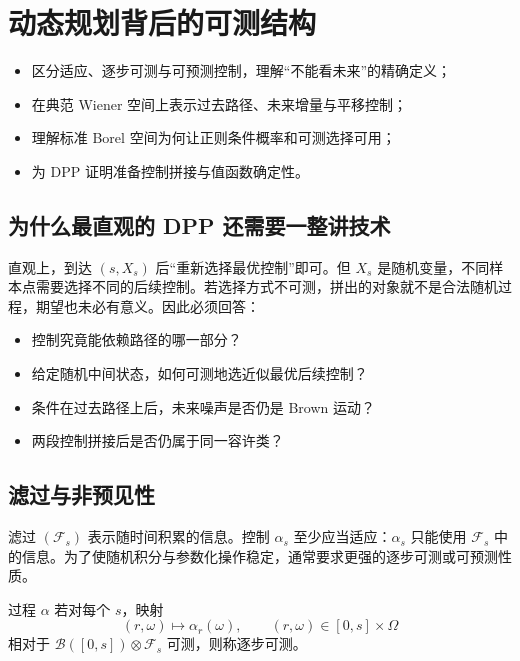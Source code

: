 \chapter{动态规划背后的可测结构}
\begin{learninggoals}
\begin{itemize}
  \item 区分适应、逐步可测与可预测控制，理解“不能看未来”的精确定义；
  \item 在典范 Wiener 空间上表示过去路径、未来增量与平移控制；
  \item 理解标准 Borel 空间为何让正则条件概率和可测选择可用；
  \item 为 DPP 证明准备控制拼接与值函数确定性。
\end{itemize}
\end{learninggoals}

\section{为什么最直观的 DPP 还需要一整讲技术}

直观上，到达 $(s,X_s)$ 后“重新选择最优控制”即可。但 $X_s$ 是随机变量，不同样本点需要选择不同的后续控制。若选择方式不可测，拼出的对象就不是合法随机过程，期望也未必有意义。因此必须回答：

\begin{itemize}
  \item 控制究竟能依赖路径的哪一部分？
  \item 给定随机中间状态，如何可测地选近似最优后续控制？
  \item 条件在过去路径上后，未来噪声是否仍是 Brown 运动？
  \item 两段控制拼接后是否仍属于同一容许类？
\end{itemize}

\section{滤过与非预见性}

滤过 $(\mathcal F_s)$ 表示随时间积累的信息。控制 $\alpha_s$ 至少应当适应：$\alpha_s$ 只能使用 $\mathcal F_s$ 中的信息。为了使随机积分与参数化操作稳定，通常要求更强的逐步可测或可预测性质。

\begin{definition}[逐步可测]
过程 $\alpha$ 若对每个 $s$，映射
\[
(r,\omega)\longmapsto\alpha_r(\omega),
\qquad (r,\omega)\in[0,s]\times\Omega
\]
相对于 $\mathcal B([0,s])\otimes\mathcal F_s$ 可测，则称逐步可测。
\end{definition}

